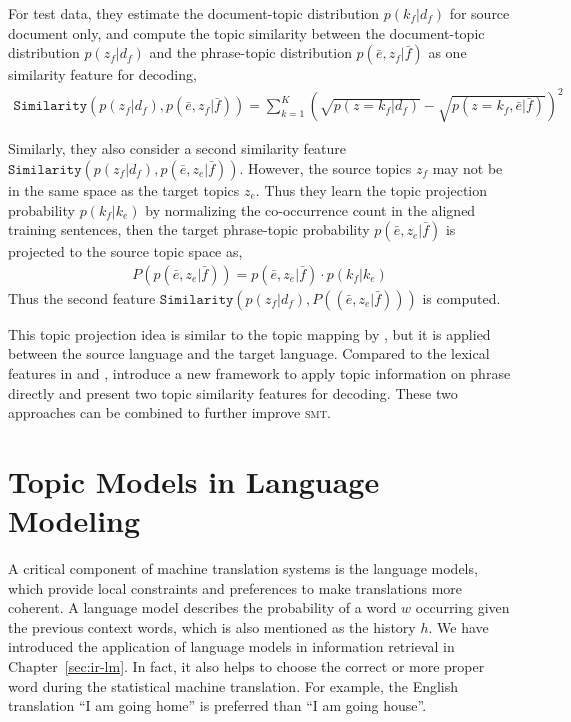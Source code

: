 For test data, they estimate the document-topic distribution $p(k_f |
d_f)$ for source document only, and compute the topic similarity
between the document-topic distribution $p(z_f|d_f)$ and the
phrase-topic distribution $p(\bar{e}, z_f|\bar{f})$ as one similarity
feature for decoding,
\begin{align}
\texttt{Similarity}(p(z_f|d_f), p(\bar{e}, z_f|\bar{f})) = \sum_{k=1}^{K} (\sqrt{p(z=k_f|d_f)} - \sqrt{p(z=k_f, \bar{e}|\bar{f})})^2
\end{align}

Similarly, they also consider a second similarity feature
$\texttt{Similarity}(p(z_f|d_f), p(\bar{e}, z_e|\bar{f}))$. However,
the source topics $z_f$ may not be in the same space as the target
topics $z_e$. Thus they learn the topic projection probability $p(k_f
| k_e)$ by normalizing the co-occurrence count in the aligned training
sentences, then the target phrase-topic probability $p(\bar{e},
z_e|\bar{f})$ is projected to the source topic space as,
\begin{align}
P(p(\bar{e}, z_e|\bar{f})) = p(\bar{e}, z_e|\bar{f}) \cdot p(k_f | k_e)
\end{align}
Thus the second feature $\texttt{Similarity}(p(z_f|d_f), P((\bar{e},
z_e|\bar{f})))$ is computed.

This topic projection idea is similar to the topic mapping by
\citet{su-12}, but it is applied between the source language and the
target language. Compared to the lexical features in
\citet{Eidelman-12} and \citet{hu-14}, \citet{xiao-12} introduce a new
framework to apply topic information on phrase directly and present
two topic similarity features for decoding. These two approaches can
be combined to further improve \textsc{smt}.



\section{Topic Models in Language Modeling}


A critical component of machine translation systems is the language
models, which provide local constraints and preferences to make
translations more coherent. A language model describes the probability
of a word $w$ occurring given the previous context words, which is
also mentioned as the history $h$. We have introduced the application
of language models in information retrieval in
Chapter~\ref{sec:ir-lm}. In fact, it also helps to choose the correct
or more proper word during the statistical machine translation. For
example, the English translation ``I am going home'' is preferred than
``I am going house''.

